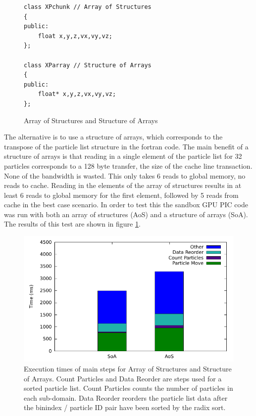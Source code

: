 \begin{figure}
\begin{lstlisting}[frame=single]
class XPchunk // Array of Structures
{
public:
	float x,y,z,vx,vy,vz;
};

class XParray // Structure of Arrays
{
public:
	float* x,y,z,vx,vy,vz;
};
\end{lstlisting}
\caption{Array of Structures and Structure of Arrays}
\end{figure}   
	
	The alternative is to use a structure of arrays, which corresponds to the transpose of the particle list structure in the fortran code. The main benefit of a structure of arrays is that reading in a single element of the particle list for 32 particles corresponds to a 128 byte transfer, the size of the cache line transaction. None of the bandwidth is wasted. This only takes 6 reads to global memory, no reads to cache. Reading in the elements of the array of structures results in at least 6 reads to global memory for the first element, followed by 5 reads from cache in the best case scenario. In order to test this the sandbox GPU PIC code was run with both an array of structures (AoS) and a structure of arrays (SoA). The results of this test are shown in figure \ref{fig:struct_compare}. 
	
\begin{figure}[h]
\begin{center}
\includegraphics[width=5in]{design/soa_vs_aos.pdf}
\end{center}
\caption[Particle List Structure Comparison]{Execution times of main steps for Array of Structures and Structure of Arrays. Count Particles and Data Reorder are steps used for a sorted particle list. Count Particles counts the number of particles in each sub-domain. Data Reorder reorders the particle list data after the binindex / particle ID pair have been sorted by the radix sort.}
\label{fig:struct_compare} 
\end{figure}



